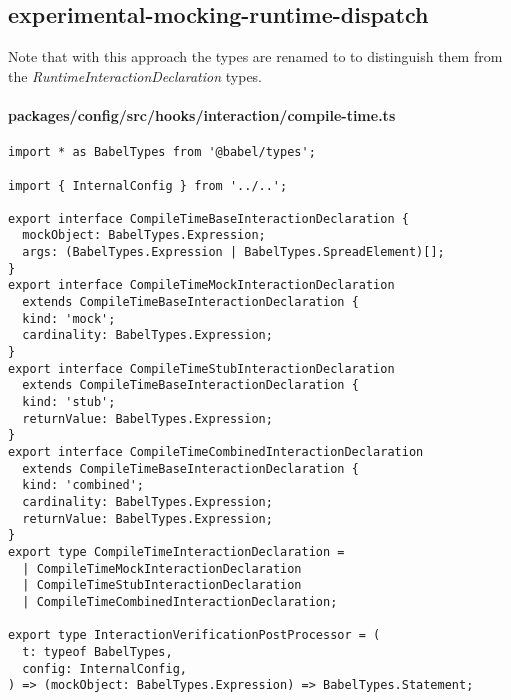 \subsection*{experimental-mocking-runtime-dispatch}
Note that with this approach the
types are renamed to
to distinguish them
from the \textit{RuntimeInteractionDeclaration} types.

\paragraph*{packages/config/src/hooks/interaction/compile-time.ts}
\begin{verbatim}
import * as BabelTypes from '@babel/types';

import { InternalConfig } from '../..';

export interface CompileTimeBaseInteractionDeclaration {
  mockObject: BabelTypes.Expression;
  args: (BabelTypes.Expression | BabelTypes.SpreadElement)[];
}
export interface CompileTimeMockInteractionDeclaration
  extends CompileTimeBaseInteractionDeclaration {
  kind: 'mock';
  cardinality: BabelTypes.Expression;
}
export interface CompileTimeStubInteractionDeclaration
  extends CompileTimeBaseInteractionDeclaration {
  kind: 'stub';
  returnValue: BabelTypes.Expression;
}
export interface CompileTimeCombinedInteractionDeclaration
  extends CompileTimeBaseInteractionDeclaration {
  kind: 'combined';
  cardinality: BabelTypes.Expression;
  returnValue: BabelTypes.Expression;
}
export type CompileTimeInteractionDeclaration =
  | CompileTimeMockInteractionDeclaration
  | CompileTimeStubInteractionDeclaration
  | CompileTimeCombinedInteractionDeclaration;

export type InteractionVerificationPostProcessor = (
  t: typeof BabelTypes,
  config: InternalConfig,
) => (mockObject: BabelTypes.Expression) => BabelTypes.Statement;
\end{verbatim}


